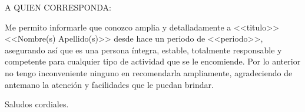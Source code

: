 \documentclass[a4paper,11pt]{letter}
\begin{document}
\begin{letter}{}

\opening{A QUIEN CORRESPONDA:}

 Me permito informarle que conozco amplia y detalladamente a <<titulo>> <<Nombre(s) Apellido(s)>> desde hace un periodo de <<periodo>>, asegurando así que es una persona íntegra, estable, totalmente responsable y competente para cualquier tipo de actividad que se le encomiende. Por lo anterior no tengo inconveniente ninguno en recomendarla ampliamente, agradeciendo de antemano la atención y facilidades que le puedan brindar.

\closing{Saludos cordiales.}

\end{letter}
\end{document}
